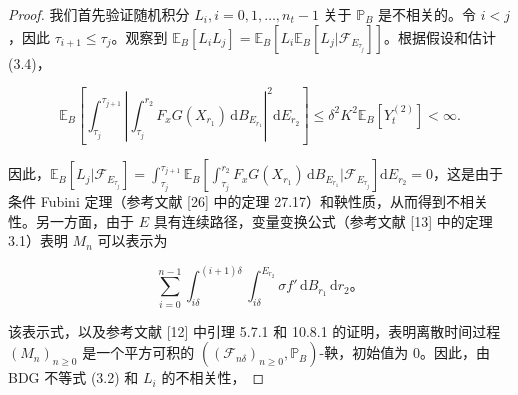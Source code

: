 \begin{proof}
	我们首先验证随机积分 $L_i, i=0,1,\ldots,n_t-1$ 关于 $\mathbb{P}_B$ 是不相关的。令 $i < j$，因此 $\tau_{i+1} \leq \tau_j$。观察到 $\mathbb{E}_B [L_i L_j] = \mathbb{E}_B \left[L_i \mathbb{E}_B [L_j | \mathcal{F}_{E_{\tau_j}}]\right]$。根据假设和估计 (3.4)，
	
	$$
	\mathbb{E}_B \left[\int_{\tau_j}^{\tau_{j+1}} \left|\int_{\tau_j}^{r_2} F_x G( X_{r_1}) \, \mathrm{d}B_{E_{r_1}}\right|^2 \mathrm{d}E_{r_2}\right] \leq \delta^2 K^2 \mathbb{E}_B [Y_t^{(2)}] < \infty.
	$$
	
	因此，$\mathbb{E}_B \left[L_j | \mathcal{F}_{E_{\tau_j}}\right] = \int_{\tau_j}^{\tau_{j+1}} \mathbb{E}_B \left[\int_{\tau_j}^{r_2} F_x G(X_{r_1}) \, \mathrm{d}B_{E_{r_1}} | \mathcal{F}_{E_{\tau_j}}\right] \mathrm{d}E_{r_2} = 0$，这是由于条件 Fubini 定理（参考文献 [26] 中的定理 27.17）和鞅性质，从而得到不相关性。另一方面，由于 $E$ 具有连续路径，变量变换公式（参考文献 [13] 中的定理 3.1）表明 $M_n$ 可以表示为
	
	$$
	\sum_{i=0}^{n-1} \int_{i\delta}^{(i+1)\delta} \int_{i\delta}^{E_{r_2}} \sigma f' \, \mathrm{d}B_{r_1} \, \mathrm{d}r_2。
	$$
	
	该表示式，以及参考文献 [12] 中引理 5.7.1 和 10.8.1 的证明，表明离散时间过程 $(M_n)_{n \geq 0}$ 是一个平方可积的 $((\mathcal{F}_{n\delta})_{n \geq 0}, \mathbb{P}_B)$-鞅，初始值为 0。因此，由 BDG 不等式 (3.2) 和 $L_i$ 的不相关性，
	

\end{proof}

